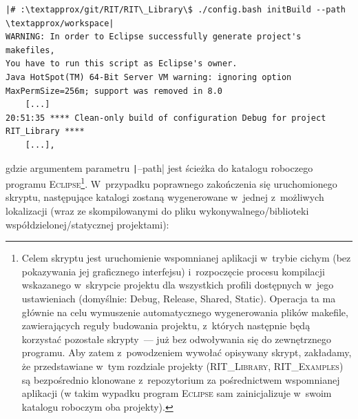 \begin{verbatim}
|# :\textapprox/git/RIT/RIT\_Library\$ ./config.bash initBuild --path \textapprox/workspace|
WARNING: In order to Eclipse successfully generate project's makefiles, 
You have to run this script as Eclipse's owner.
Java HotSpot(TM) 64-Bit Server VM warning: ignoring option MaxPermSize=256m; support was removed in 8.0
	[...]
20:51:35 **** Clean-only build of configuration Debug for project RIT_Library ****
	[...],
\end{verbatim}
gdzie argumentem parametru \texttt|--path| jest ścieżka do katalogu roboczego programu \textsc{Eclipse}\footnote{
	Celem skryptu jest uruchomienie wspomnianej aplikacji w~trybie cichym (bez pokazywania jej graficznego interfejsu) i~rozpoczęcie procesu kompilacji wskazanego w~skrypcie projektu dla wszystkich profili dostępnych w~jego ustawieniach (domyślnie: \textsf{Debug}, \textsf{Release}, \textsf{Shared}, \textsf{Static}).
	Operacja ta ma głównie na celu wymuszenie automatycznego wygenerowania plików \textsf{makefile}, zawierających reguły budowania projektu, z~których następnie będą korzystać pozostałe skrypty~--- już bez odwoływania się do zewnętrznego programu.
	Aby zatem z~powodzeniem wywołać opisywany skrypt, zakładamy, że przedstawiane w~tym rozdziale projekty (\textsc{RIT\_Library}, \textsc{RIT\_Examples}) są bezpośrednio klonowane z~repozytorium za pośrednictwem wspomnianej aplikacji (w takim wypadku program \textsc{Eclipse} sam zainicjalizuje w~swoim katalogu roboczym oba projekty).
}.
W~przypadku poprawnego zakończenia się uruchomionego skryptu, następujące katalogi zostaną wygenerowane w~jednej z~możliwych lokalizacji (wraz ze skompilowanymi do pliku wykonywalnego/biblioteki współdzielonej/statycznej projektami):

\small
\noindent{}

